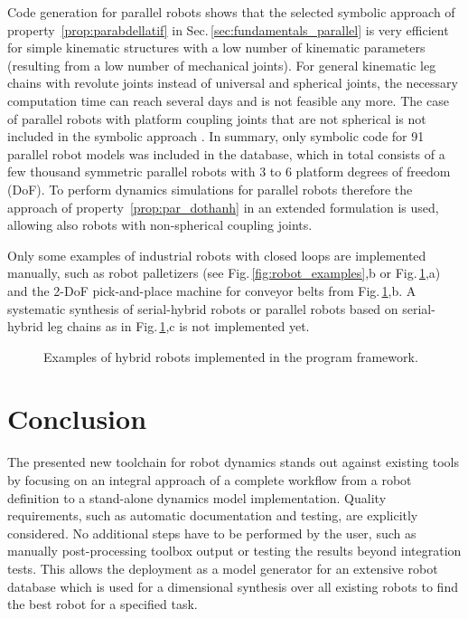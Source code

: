 \documentclass[runningheads]{llncs}
\begin{document}
Code generation for parallel robots shows that the selected symbolic approach \cite{AbdellatifHei2009} of property~\ref{prop:parabdellatif} in Sec.\,\ref{sec:fundamentals_parallel} is very efficient for simple kinematic structures with a low number of kinematic parameters (resulting from a low number of mechanical joints).
For general kinematic leg chains with revolute joints instead of universal and spherical joints, the necessary computation time can reach several days and is not feasible any more.
The case of parallel robots with platform coupling joints that are not spherical is not included in the symbolic approach \cite{AbdellatifHei2009}.
In summary, only symbolic code for 91 parallel robot models was included in the database, which in total consists of a few thousand symmetric parallel robots with 3 to 6 platform degrees of freedom (DoF).
To perform dynamics simulations for parallel robots therefore the approach \cite{DoThanhKotHeiOrt2009b} of property~\ref{prop:par_dothanh} in an extended formulation is used, allowing also robots with non-spherical coupling joints.

Only some examples of industrial robots with closed loops are implemented manually, such as robot palletizers (see Fig.\,\ref{fig:robot_examples},b or Fig.\,\ref{fig:robot_examples_hybrid},a) and the 2-DoF pick-and-place machine for conveyor belts from Fig.\,\ref{fig:robot_examples_hybrid},b.
A systematic synthesis of serial-hybrid robots or parallel robots based on serial-hybrid leg chains as in Fig.\,\ref{fig:robot_examples_hybrid},c is not implemented yet.

\begin{figure}[tb]

\vspace{-0.6cm}
\caption{Examples of hybrid robots implemented in the program framework.} %
\vspace{-0.1cm}
\label{fig:robot_examples_hybrid}
\end{figure} 

\section{Conclusion}
\label{sec:conclusion}

The presented new toolchain for robot dynamics stands out against existing tools by focusing on an integral approach of a complete workflow from a robot definition to a stand-alone dynamics model implementation.
Quality requirements, such as automatic documentation and testing, are explicitly considered.
No additional steps have to be performed by the user, such as manually post-processing toolbox output or testing the results beyond integration tests.
This allows the deployment as a model generator for an extensive robot database which is used for a dimensional synthesis over all existing robots to find the best robot for a specified task.
\end{document}
